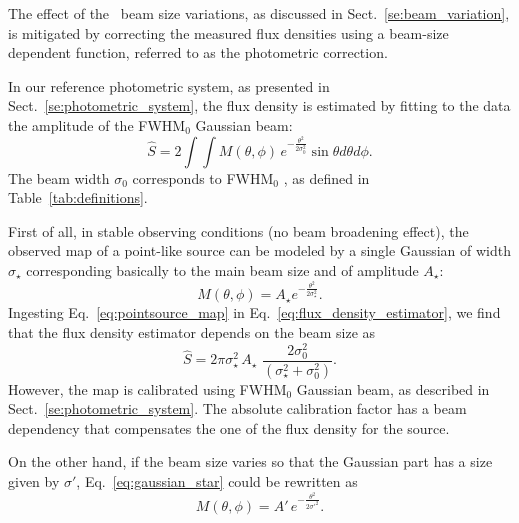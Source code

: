 %

The effect of the \afternoon\ beam size variations, as discussed
in Sect.~\ref{se:beam_variation}, is mitigated by correcting the
measured flux densities using a beam-size dependent function, referred
to as the photometric correction.

In our reference photometric system, as presented in
Sect.~\ref{se:photometric_system}, 
the flux density is estimated by fitting to the data the amplitude of
the FWHM$_0$ Gaussian beam:
\begin{equation}
  \hat{S}  = 2 \int \int M(\theta, \phi)\, e^{-\frac{\theta^{2}}{2\sigma_{0}^{2}}} \sin \theta d\theta d\phi.
  \label{eq:flux_density_estimator}
\end{equation}
The beam width $\sigma_{0}$ corresponds to FWHM$_0$%
, as defined in Table~\ref{tab:definitions}.


First of all, in stable observing conditions (no beam
broadening effect), the observed map of a point-like source can be modeled by a single Gaussian of
width $\sigma_\star$ corresponding basically to the main beam size and
of amplitude $A_\star$:
\begin{equation}
  M(\theta, \phi) = A_\star e^{-\frac{\theta^{2}}{2\sigma_\star^{2}}}.
  \label{eq:pointsource_map}
\end{equation}
Ingesting Eq.~\ref{eq:pointsource_map} in
Eq.~\ref{eq:flux_density_estimator}, we find that the flux density
estimator depends on the beam size as
\begin{equation}
  \hat{S}  = 2\pi \sigma_{\star}^2 \, A_{\star} \, \,  \frac{2 \sigma_0^2}{(\sigma_{\star}^2 + \sigma_0^2)}.
  \label{eq:gaussian_star}
\end{equation}
However, the map is calibrated using FWHM$_0$ Gaussian beam, as described in
Sect.~\ref{se:photometric_system}. The absolute calibration factor %
has a beam dependency that compensates the one of the flux density for the source.

On the other hand, if the beam size varies so that the Gaussian part has a size given by
$\sigma'$, Eq.~\ref{eq:gaussian_star} could be rewritten as 
\begin{equation}
  M(\theta, \phi) = A'\, e^{-\frac{\theta^{2}}{2\sigma'^{2}}}.
  \label{eq:broader_beam_map}
\end{equation}

